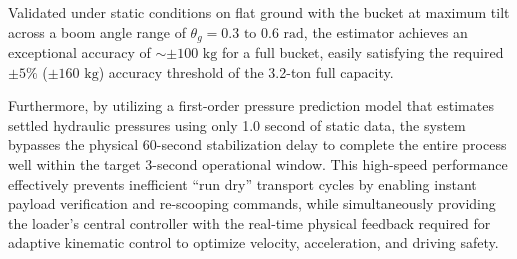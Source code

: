 \documentclass[12pt, a4paper]{article}
\begin{document}
Validated under static conditions on flat ground with the bucket at maximum tilt across a boom angle range of $\theta_g = 0.3 \text{ to } 0.6\text{ rad}$, the estimator achieves an exceptional accuracy of $\sim\pm 100\text{ kg}$ for a full bucket, easily satisfying the required $\pm 5\%$ ($\pm 160\text{ kg}$) accuracy threshold of the 3.2-ton full capacity. 

Furthermore, by utilizing a first-order pressure prediction model that estimates settled hydraulic pressures using only 1.0 second of static data, the system bypasses the physical 60-second stabilization delay to complete the entire process well within the target 3-second operational window. This high-speed performance effectively prevents inefficient ``run dry'' transport cycles by enabling instant payload verification and re-scooping commands, while simultaneously providing the loader's central controller with the real-time physical feedback required for adaptive kinematic control to optimize velocity, acceleration, and driving safety.
\end{document}
